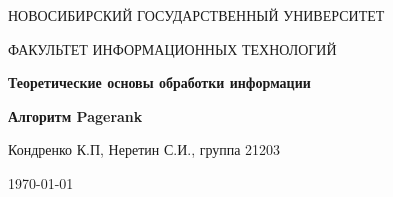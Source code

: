 \begin{center}
	{\LARGE \textsc{НОВОСИБИРСКИЙ ГОСУДАРСТВЕННЫЙ УНИВЕРСИТЕТ}\par}
	{\textsc{ФАКУЛЬТЕТ ИНФОРМАЦИОННЫХ ТЕХНОЛОГИЙ}\par}
	
	\vspace{3cm}
	
	{\huge\bfseries Теоретические основы обработки информации\par}


	
	\vspace{1cm}
	
	{\Large\bfseries Алгоритм Pagerank\par}
	
	\vspace{10cm}
	
	\begin{flushright}
		Кондренко К.П, Неретин С.И., группа 21203
	\end{flushright}
	
	\vfill
	
	{\large \today\par}
\end{center}
